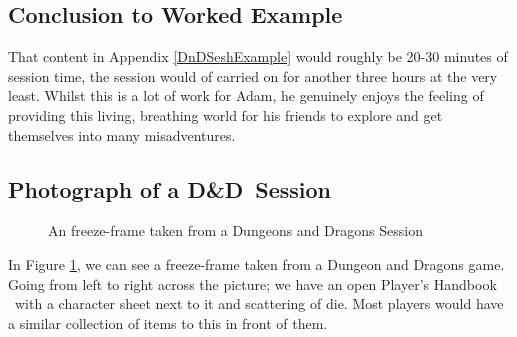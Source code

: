 \documentclass[review]{cmpreport}
\newcommand{\dnd}{D\&D}
\begin{document}
	\subsection{Conclusion to Worked Example}\label{DnDWEConc}
	That content in Appendix \ref{DnDSeshExample} would roughly be 20-30 minutes of session time, the session would of carried on for another three hours at the very least. Whilst this is a lot of work for Adam, he genuinely enjoys the feeling of providing this living, breathing world for his friends to explore and get themselves into many misadventures.
	
	\subsection{Photograph of a \dnd \ Session}
	\begin{figure}
		\centering
		\caption{An freeze-frame taken from a Dungeons and Dragons Session \citep{Personal}} \label{DnDLive}
	\end{figure}
	In Figure \ref{DnDLive}, we can see a freeze-frame taken from a Dungeon and Dragons game. Going from left to right across the picture; we have an open Player's Handbook \citep{PlayerHandbook} \ with a character sheet next to it and scattering of die. Most players would have a similar collection of items to this in front of them. 
	
\end{document}
